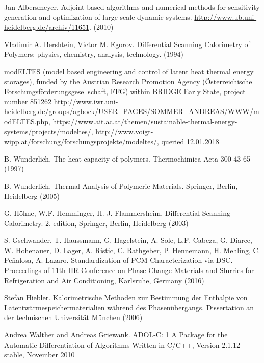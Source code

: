 \documentclass{scrartcl}[12pt, halfparskip]
\numberwithin{equation}{section}
\numberwithin{figure}{section}
\numberwithin{table}{section}
\begin{document}
\begin{thebibliography}{9}

	 Jan Albersmeyer.
	 Adjoint-based algorithms and numerical methods for sensitivity generation and optimization of large scale dynamic systems.
	 \url{http://www.ub.uni-heidelberg.de/archiv/11651}.
	 (2010)

	Vladimir A. Bershtein, Victor M. Egorov.
	Differential Scanning Calorimetry of Polymers: physics, chemistry, analysis, technology.
	(1994)
	
	modELTES (model based engineering and control of latent heat thermal energy storages), 
	funded by the Austrian Research Promotion Agency (Österreichische Forschungsförderungsgesellschaft, FFG) within BRIDGE Early State, project number 851262
	\url{http://www.iwr.uni-heidelberg.de/groups/agbock/USER_PAGES/SOMMER_ANDREAS/WWW/modELTES.php}, 
	\url{https://www.ait.ac.at/themen/sustainable-thermal-energy-systems/projects/modeltes/}, 
	\url{http://www.voigt-wipp.at/forschung/forschungsprojekte/modeltes/}, queried 12.01.2018
	
	B. Wunderlich.
	The heat capacity of polymers.
	Thermochimica Acta 300 43-65 (1997)
	
	B. Wunderlich.
	Thermal Analysis of Polymeric Materials.
	Springer, Berlin, Heidelberg (2005)
	
	G. Höhne, W.F. Hemminger, H.-J. Flammersheim.
	Differential Scanning Calorimetry.
	2. edition, Springer, Berlin, Heidelberg (2003)
	
	S. Gschwander, T. Haussmann, G. Hagelstein, A. Sole, L.F. Cabeza, G. Diarce, W. Hohenauer, D. Lager, A. Ristic, C. Rathgeber, P. Hennemann, H. Mehling, C. Peñalosa, A. Lazaro.
	Standardization of PCM Characterization via DSC.
	Proceedings of 11th IIR Conference on Phase-Change Materials and Slurries for Refrigeration and Air Conditioning, Karlsruhe, Germany (2016)
	
	Stefan Hiebler.
	Kalorimetrische Methoden zur Bestimmung
	der Enthalpie von Latentwärmespeichermaterialien
	während des Phasenübergangs.
	Dissertation an der technischen Universität München 
	(2006)

	Andrea Walther and Andreas Griewank.
	ADOL-C: 1
	A Package for the Automatic Differentiation
	of Algorithms Written in C/C++,
	Version 2.1.12-stable, November 2010


\end{thebibliography}
\end{document}

